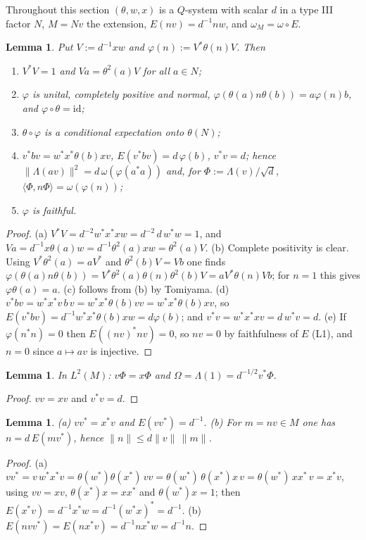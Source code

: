 \documentclass[11pt]{article}
\newtheorem{lemma}[theorem]{Lemma}
\theoremstyle{definition}
\theoremstyle{remark}
\newcommand{\Om}{\Omega}
\newcommand{\Lam}{\Lambda}
\newcommand{\ph}{\varphi}
\newcommand{\ip}[2]{\langle #1,#2\rangle}
\begin{document}
Throughout this section $(\theta,w,x)$ is a $Q$-system with scalar $d$ in a type III factor $N$, $M=Nv$ the extension, $E(nv)=d^{-1}nw$, and $\omega_M=\omega\circ E$.

\begin{lemma}\label{lem:V}
Put $V:=d^{-1}xw$ and $\ph(n):=V^*\theta(n)V$. Then
\begin{enumerate}[label=(\alph*),nosep]
\item $V^*V=1$ and $Va=\theta^2(a)V$ for all $a\in N$;
\item $\ph$ is unital, completely positive and normal, $\ph(\theta(a)n\theta(b))=a\ph(n)b$, and $\ph\circ\theta=\mathrm{id}$;
\item $\theta\circ\ph$ is a conditional expectation onto $\theta(N)$;
\item $v^*bv=w^*x^*\theta(b)xv$, $E(v^*bv)=d\,\ph(b)$, $v^*v=d$; hence $\|\Lam(av)\|^2=d\,\omega(\ph(a^*a))$ and, for $\Phi:=\Lam(v)/\sqrt d$, $\ip{\Phi}{n\Phi}=\omega(\ph(n))$;
\item $\ph$ is faithful.
\end{enumerate}
\end{lemma}
\begin{proof}
(a) $V^*V=d^{-2}w^*x^*xw=d^{-2}\,d\,w^*w=1$, and $Va=d^{-1}x\theta(a)w=d^{-1}\theta^2(a)xw=\theta^2(a)V$. (b) Complete positivity is clear. Using $V^*\theta^2(a)=aV^*$ and $\theta^2(b)V=Vb$ one finds $\ph(\theta(a)n\theta(b))=V^*\theta^2(a)\theta(n)\theta^2(b)V=aV^*\theta(n)Vb$; for $n=1$ this gives $\ph\theta(a)=a$. (c) follows from (b) by Tomiyama. (d) $v^*bv=w^*x^*v\,b\,v=w^*x^*\theta(b)vv=w^*x^*\theta(b)xv$, so $E(v^*bv)=d^{-1}w^*x^*\theta(b)xw=d\ph(b)$; and $v^*v=w^*x^*xv=d\,w^*v=d$. (e) If $\ph(n^*n)=0$ then $E((nv)^*nv)=0$, so $nv=0$ by faithfulness of $E$ (L1), and $n=0$ since $a\mapsto av$ is injective.
\end{proof}

\begin{lemma}\label{lem:vPhi}
In $L^2(M)$: $v\Phi=x\Phi$ and $\Om=\Lam(1)=d^{-1/2}v^*\Phi$.
\end{lemma}
\begin{proof} $vv=xv$ and $v^*v=d$. \end{proof}

\begin{lemma}\label{lem:coeff}
(a) $vv^*=x^*v$ and $E(vv^*)=d^{-1}$. (b) For $m=nv\in M$ one has $n=d\,E(mv^*)$, hence $\|n\|\le d\|v\|\,\|m\|$.
\end{lemma}
\begin{proof}
(a) $vv^*=v\,w^*x^*v=\theta(w^*)\theta(x^*)\,vv=\theta(w^*)\,\theta(x^*)x\,v=\theta(w^*)\,xx^*\,v=x^*v$, using $vv=xv$, $\theta(x^*)x=xx^*$ and $\theta(w^*)x=1$; then $E(x^*v)=d^{-1}x^*w=d^{-1}(w^*x)^*=d^{-1}$. (b) $E(nvv^*)=E(nx^*v)=d^{-1}nx^*w=d^{-1}n$.
\end{proof}
\end{document}
